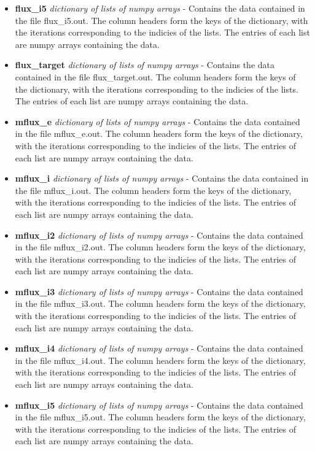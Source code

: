 \documentclass{article}
\begin{document}
\begin{itemize}
\begin{itemize}
\item \textbf{flux\_i5} \emph{dictionary of lists of numpy arrays} - Contains the data contained in the file flux\_i5.out.  The column headers form the keys of the dictionary, with the iterations corresponding to the indicies of the lists.  The entries of each list are numpy arrays containing the data.
\item \textbf{flux\_target} \emph{dictionary of lists of numpy arrays} - Contains the data contained in the file flux\_target.out.  The column headers form the keys of the dictionary, with the iterations corresponding to the indicies of the lists.  The entries of each list are numpy arrays containing the data.
\item \textbf{mflux\_e} \emph{dictionary of lists of numpy arrays} - Contains the data contained in the file mflux\_e.out.  The column headers form the keys of the dictionary, with the iterations corresponding to the indicies of the lists.  The entries of each list are numpy arrays containing the data.
\item \textbf{mflux\_i} \emph{dictionary of lists of numpy arrays} - Contains the data contained in the file mflux\_i.out.  The column headers form the keys of the dictionary, with the iterations corresponding to the indicies of the lists.  The entries of each list are numpy arrays containing the data.
\item \textbf{mflux\_i2} \emph{dictionary of lists of numpy arrays} - Contains the data contained in the file mflux\_i2.out.  The column headers form the keys of the dictionary, with the iterations corresponding to the indicies of the lists.  The entries of each list are numpy arrays containing the data.
\item \textbf{mflux\_i3} \emph{dictionary of lists of numpy arrays} - Contains the data contained in the file mflux\_i3.out.  The column headers form the keys of the dictionary, with the iterations corresponding to the indicies of the lists.  The entries of each list are numpy arrays containing the data.
\item \textbf{mflux\_i4} \emph{dictionary of lists of numpy arrays} - Contains the data contained in the file mflux\_i4.out.  The column headers form the keys of the dictionary, with the iterations corresponding to the indicies of the lists.  The entries of each list are numpy arrays containing the data.
\item \textbf{mflux\_i5} \emph{dictionary of lists of numpy arrays} - Contains the data contained in the file mflux\_i5.out.  The column headers form the keys of the dictionary, with the iterations corresponding to the indicies of the lists.  The entries of each list are numpy arrays containing the data.

\end{itemize}
\end{itemize}
\end{document}

